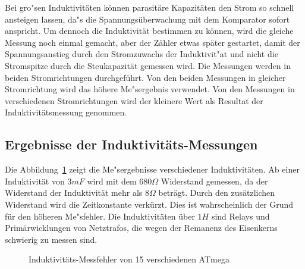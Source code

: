 Bei gro"sen Induktivit\"aten k\"onnen parasit\"are Kapazit\"aten den Strom so schnell ansteigen lassen, da"s
die Spannungs\"uberwachung mit dem Komparator sofort anspricht. Um dennoch die Induktivit\"at bestimmen zu
k\"onnen, wird die gleiche Messung noch einmal gemacht, aber der Z\"ahler etwas sp\"ater gestartet, damit
der Spannungsanstieg durch den Stromzuwachs der Induktivit"at und nicht die Stromspitze durch die
Steukapazit\"at gemessen wird.
Die Messungen werden in beiden Stromrichtungen durchgef\"uhrt.
Von den beiden Messungen in gleicher Stromrichtung wird das h\"ohere Me"sergebnis verwendet.
Von den Messungen in verschiedenen Stromrichtungen wird der kleinere Wert als Resultat der Induktivit\"atsmessung genommen.

\subsection{Ergebnisse der Induktivit\"ats-Messungen}
Die Abbildung~\ref{fig:Induct328p} zeigt die Me"sergebnisse verschiedener Induktivit\"aten.
Ab einer Induktivit\"at von \(3 mF\) wird mit dem \(680 \Omega\) Widerstand gemessen, da der Widerstand
der Induktivit\"at mehr als \(8 \Omega\) betr\"agt. Durch den zus\"atzlichen Widerstand wird die
Zeitkonstante verk\"urzt. Dies ist wahrscheinlich der Grund f\"ur den h\"oheren Me"sfehler.
Die Induktivit\"aten \"uber \(1 H\) sind Relays und Prim\"arwicklungen von Netztrafos, die wegen
der Remanenz des Eisenkerns schwierig zu messen sind.

\begin{figure}[H]
\centering

\caption{Induktivit\"ats-Messfehler von 15 verschiedenen ATmega}
\label{fig:Induct328p}
\end{figure}
